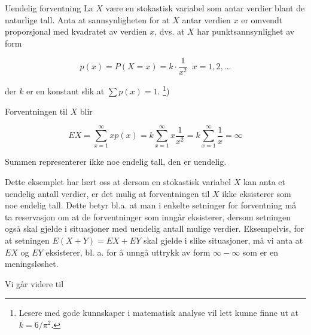 \begin{eksempel}{Uendelig forventning}
La $X$ være en stokastisk variabel som antar verdier blant de
naturlige tall. Anta at sannsynligheten for at $X$ antar verdien
$x$ er omvendt proporsjonal med kvadratet av verdien $x$, dvs. at
$X$ har punktsannsynlighet av form

\[ p(x)=P(X=x)=k \cdot \frac{1}{x^2} \; \; x=1,2, \ldots   \]

\noindent der $k$ er en konstant slik at $ \sum p(x)=1$. \footnote{Lesere
med gode kunnskaper i matematisk analyse vil lett kunne finne ut at
$k= 6/{\pi}^2$.})

\noindent Forventningen til $X$ blir

\[  EX=\sum_{x=1}^{\infty}xp(x)=k \sum_{x=1}^{\infty}x \frac{1}{x^2}=
            k \sum_{x=1}^{\infty} \frac{1}{x}=\infty \]

\noindent Summen representerer ikke noe endelig tall, den er uendelig.
\end{eksempel}

Dette eksemplet har lært oss at dersom en stokastisk variabel $X$
kan anta et uendelig antall verdier, er det mulig at forventningen
til $X$ ikke eksisterer som noe endelig tall. Dette betyr bl.a.
at man i enkelte setninger for forventning må ta reservasjon om
at de forventninger som inngår eksisterer, dersom setningen også
skal gjelde i situasjoner med uendelig antall mulige verdier.
Eksempelvis, for at setningen $E(X+Y)=EX+EY$ skal gjelde i slike
situasjoner, må vi anta at $EX$ og $EY$ eksisterer, bl. a. for å
unngå uttrykk av form $\infty - \infty$ som er en meningsløshet.

     Vi går videre til \\


